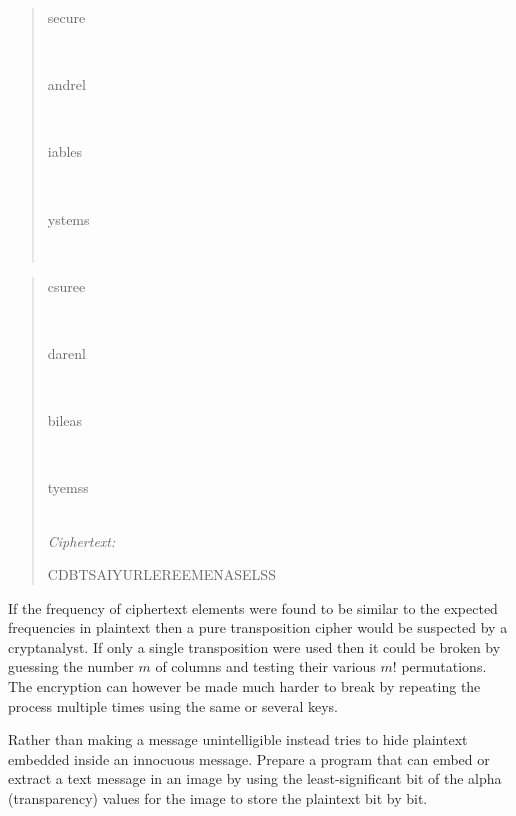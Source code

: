 \noindent
\begin{minipage}{32mm}
\begin{quote}
  \begin{code}secure\end{code} \\
  \begin{code}andrel\end{code} \\
  \begin{code}iables\end{code} \\
  \begin{code}ystems\end{code} \\
\end{quote}
\end{minipage}
\hfill {} \hfill
\begin{minipage}{83mm}
\begin{quote}
  \begin{code}csuree\end{code} \\
  \begin{code}darenl\end{code} \\
  \begin{code}bileas\end{code} \\
  \begin{code}tyemss\end{code} \\
 \emph{Ciphertext:} \begin{code}CDBTSAIYURLEREEMENASELSS\end{code}
\end{quote}
\end{minipage}

\noindent
If the frequency of ciphertext elements were found to be similar to the expected frequencies
in plaintext then a pure transposition cipher would be suspected by a cryptanalyst.
If only a single transposition were used then it could be broken by
guessing the number $m$ of columns and testing their various $m!$ permutations.
The encryption can however be made much harder to break by repeating the process
multiple times using the same or several keys.


\begin{exercise}[Steganography]
Rather than making a message unintelligible  instead
tries to hide plaintext embedded inside an innocuous message.
Prepare a program that can embed or extract a text message in an image by
using the least-significant bit of the alpha (transparency) values for the image
to store the plaintext bit by bit.
\end{exercise}


